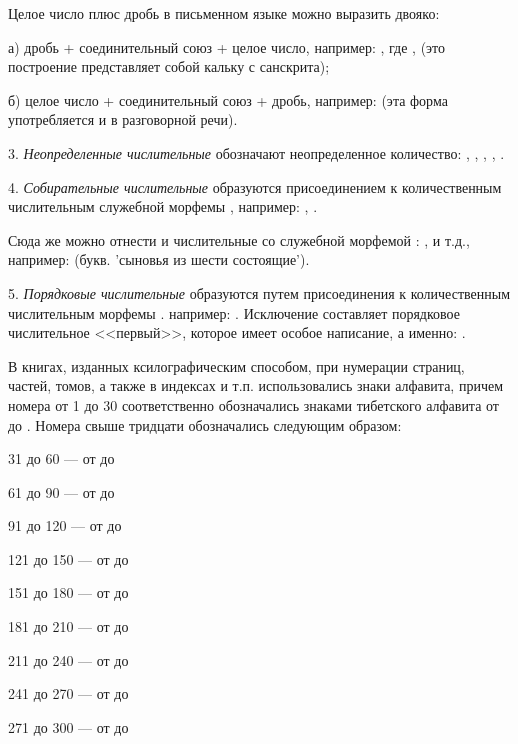 Целое число плюс дробь в письменном языке можно выразить двояко:
\begin{description}
    \item а) дробь + соединительный союз  + целое число, например:
    , где	,  (это построение представляет собой кальку с санскрита);
    \item б) целое число + соединительный союз + дробь, например:  (эта форма употребляется и в разговорной речи).
\end{description}

3. \emph{Неопределенные числительные} обозначают неопределенное количество:
,
,
,
, .

4. \emph{Собирательные числительные} образуются присоединением к количественным числительным служебной морфемы , например: , .

Сюда же можно отнести и числительные со служебной морфемой :
,
 и т.д., например:
 (букв. 'сыновья из шести состоящие').

5. \emph{Порядковые числительные} образуются путем присоединения к количественным числительным морфемы . например: . Исключение составляет порядковое числительное <<первый>>, которое имеет особое написание, а именно: .

В книгах, изданных ксилографическим способом, при нумерации страниц, частей, томов, а также в индексах и т.п. использовались знаки алфавита, причем номера от 1 до 30 соответственно обозначались знаками тибетского алфавита от  до . Номера свыше тридцати обозначались следующим образом:
\begin{description}
    \item 31 до 60 --- от  до 
    \item 61 до 90 --- от  до 
    \item 91 до 120 --- от  до 
    \item 121 до 150 --- от  до 
    \item 151 до 180 --- от	 до 
    \item 181 до 210 --- от	 до 
    \item 211 до 240 --- от  до 
    \item 241 до 270 --- от  до 
    \item 271 до 300 --- от  до 
\end{description}

